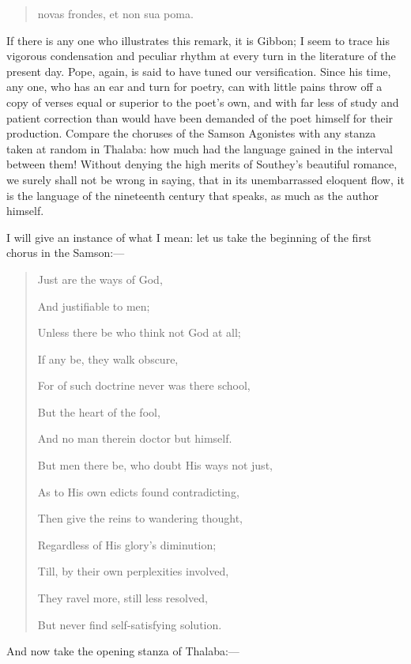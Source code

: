\begin{quote}

novas frondes, et non sua poma.

\end{quote}

If there is any one who illustrates this remark, it is Gibbon; I
seem to trace his vigorous condensation and peculiar rhythm at every
turn in the literature of the present day. Pope, again, is said to
have tuned our versification. Since his time, any one, who has an ear
and turn for poetry, can with little pains throw off a copy of verses
equal or superior to the poet's own, and with far less of study and
patient correction than would have been demanded of the poet himself
for their production. Compare the choruses of the Samson Agonistes
with any stanza taken at random in Thalaba: how much had the language
gained in the interval between them! Without denying the high merits
of Southey's beautiful romance, we surely shall not be wrong in
saying, that in its unembarrassed eloquent flow, it is the language of
the nineteenth century that speaks, as much as the author himself.

I will give an instance of what I mean: let us take the beginning
of the first chorus in the Samson:—

\begin{quote}

Just are the ways of God,

And justifiable to men;

Unless there be who think not God at all;

If any be, they walk obscure,

For of such doctrine never was there school,

But the heart of the fool,

And no man therein doctor but himself.

But men there be, who doubt His ways not just,

As to His own edicts found contradicting,

Then give the reins to wandering thought,

Regardless of His glory's diminution;

Till, by their own perplexities involved,

They ravel more, still less resolved,

But never find self-satisfying solution.
\end{quote}

And now take the opening stanza of Thalaba:—

